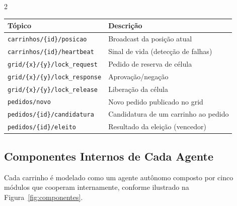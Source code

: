 \documentclass[a4paper]{article}
\begin{document}
\begin{multicols}{2}
\noindent
\begin{minipage}{\columnwidth}
\centering
{}
\label{tab:topicos}
\vspace{0.3em}
\begin{tabular}{|l|p{3.5cm}|}
\hline
\textbf{T\'opico} & \textbf{Descri\c{c}\~ao} \\ \hline
\texttt{carrinhos/\{id\}/posicao} & Broadcast da posi\c{c}\~ao atual \\ \hline
\texttt{carrinhos/\{id\}/heartbeat} & Sinal de vida (detec\c{c}\~ao de falhas) \\ \hline
\texttt{grid/\{x\}/\{y\}/lock\_request} & Pedido de reserva de c\'elula \\ \hline
\texttt{grid/\{x\}/\{y\}/lock\_response} & Aprova\c{c}\~ao/nega\c{c}\~ao \\ \hline
\texttt{grid/\{x\}/\{y\}/lock\_release} & Libera\c{c}\~ao da c\'elula \\ \hline
\texttt{pedidos/novo} & Novo pedido publicado no grid \\ \hline
\texttt{pedidos/\{id\}/candidatura} & Candidatura de um carrinho ao pedido \\ \hline
\texttt{pedidos/\{id\}/eleito} & Resultado da elei\c{c}\~ao (vencedor) \\ \hline
\end{tabular}
\end{minipage}

\subsection{Componentes Internos de Cada Agente}

Cada carrinho \'e modelado como um agente aut\^onomo composto por cinco m\'odulos que cooperam internamente, conforme ilustrado na Figura~\ref{fig:componentes}.

\end{multicols}
\end{document}
